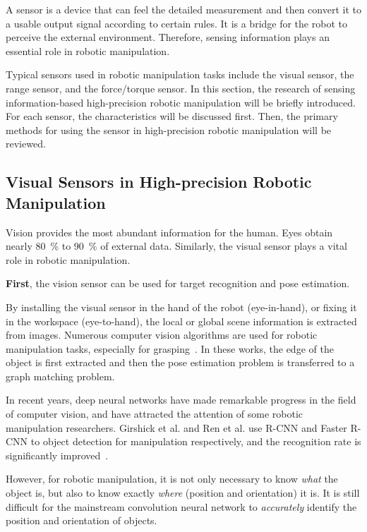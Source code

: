 \documentclass[journal,twoside,web]{ieeecolor}
\begin{document}
A sensor is a device that can feel the detailed measurement and then convert it to a usable output signal according to certain rules. It is a bridge for the robot to perceive the external environment. Therefore, sensing information plays an essential role in robotic manipulation.

Typical sensors used in robotic manipulation tasks include the visual sensor, the range sensor, and the force/torque sensor. In this section, the research of sensing information-based high-precision robotic manipulation will be briefly introduced. For each sensor, the characteristics will be discussed first. Then, the primary methods for using the sensor in high-precision robotic manipulation will be reviewed.

\subsection{Visual Sensors in High-precision Robotic Manipulation}
\label{subsec:visual_sensor}

Vision provides the most abundant information for the human. Eyes obtain nearly \SI{80}{\percent} to \SI{90}{\percent} of external data. Similarly, the visual sensor plays a vital role in robotic manipulation. 

\textbf{First}, the vision sensor can be used for target recognition and pose estimation. 

By installing the visual sensor in the hand of the robot (eye-in-hand), or fixing it in the workspace (eye-to-hand), the local or global scene information is extracted from images. 
Numerous computer vision algorithms are used for robotic manipulation tasks, especially for grasping~\cite{Morales2006,RecatalA2008,Speth2008,Su2009,Kobayashi2015,Ortenzi2018,Hu2019}. 
In these works, the edge of the object is first extracted and then the pose estimation problem is transferred to a graph matching problem.

In recent years, deep neural networks have made remarkable progress in the field of computer vision, and have attracted the attention of some robotic manipulation researchers. 
Girshick et al. and Ren et al. use R-CNN and Faster R-CNN to object detection for manipulation respectively, and the recognition rate is significantly improved~\cite{Girshick2014Rich,ren2017faster}. 

However, for robotic manipulation, it is not only necessary to know \textit{what} the object is, but also to know exactly \textit{where} (position and orientation) it is. It is still difficult for the mainstream convolution neural network to \textit{accurately} identify the position and orientation of objects.
\end{document}
